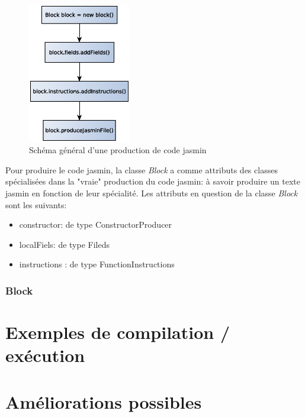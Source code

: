 \documentclass[11pt,a4paper]{article}
\begin{document}
  \newpage
    \begin{figure}[h]
    \includegraphics[width=0.4\textwidth,center]{../ressources/jasminFileProducionOverview.eps}
    \caption{Schéma général d'une production de code jasmin}
  \end{figure}
  
  \par Pour produire le code jasmin, la classe \textit{Block} a comme attributs des classes spécialisées dans la "vraie" production du code jasmin: à savoir produire un  texte jasmin en fonction de leur spécialité. Les attributs en question de la classe \textit{Block} sont les suivants: 
  
  \begin{itemize}
    \item constructor: de type ConstructorProducer
    \item localFiels: de type Fileds
    \item instructions : de type FunctionInstructions
  \end{itemize}
  
  \subsubsection{Block}
  
  \section{Exemples de compilation / exécution}
  
  \section{Améliorations possibles}
   
\end{document}
